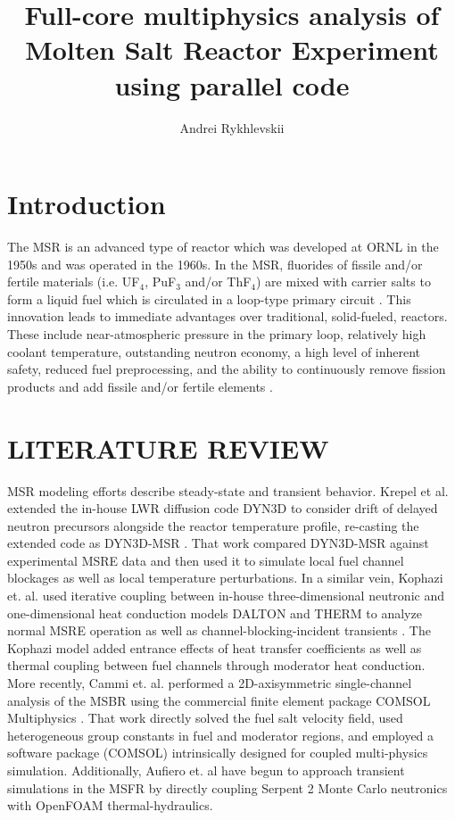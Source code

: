 \documentclass{anstrans}
\title{Full-core multiphysics analysis of Molten Salt Reactor Experiment using parallel code}
\author{Andrei Rykhlevskii}
\begin{document}
\section{Introduction}
The \gls{MSR} is an advanced type of reactor which was developed at \gls{ORNL} 
in the 1950s and was operated in the 1960s. In the MSR, fluorides of fissile 
and/or fertile materials (i.e. UF$_4$, PuF$_3$ and/or ThF$_4$) are mixed with 
carrier salts to form a liquid fuel which is circulated in a loop-type primary 
circuit \cite{haubenreich_experience_1970}. This innovation leads to immediate 
advantages over traditional, solid-fueled, reactors. These include 
near-atmospheric pressure in the primary loop, relatively high coolant 
temperature, outstanding neutron economy, a high level of inherent safety, 
reduced fuel preprocessing, and the ability to continuously remove fission 
products and add fissile and/or fertile elements \cite{leblanc_molten_2010}. 

\section{LITERATURE REVIEW}
\gls{MSR} modeling efforts describe steady-state and
transient behavior. Krepel et al. extended the in-house \gls{LWR}
diffusion code DYN3D to consider drift of delayed neutron precursors alongside
the reactor temperature profile, re-casting the extended code as
DYN3D-MSR \cite{krepel_dyn3d-msr_2007}. That work compared DYN3D-MSR against
experimental \gls{MSRE} data and then used it to simulate local fuel channel
blockages as well as local temperature perturbations. In a similar vein, Kophazi
et. al. used iterative coupling between in-house three-dimensional neutronic and
one-dimensional heat conduction models DALTON and THERM to analyze normal 
\gls{MSRE} operation as well as channel-blocking-incident
transients \cite{kophazi_development_2009}. The Kophazi model added entrance 
effects of heat transfer coefficients as well as thermal
coupling between fuel channels through moderator heat conduction. More recently,
Cammi et. al. performed a 2D-axisymmetric single-channel analysis of the
\gls{MSBR} using the commercial finite element package COMSOL
Multiphysics \cite{cammi_multi-physics_2011}. That work directly solved the 
fuel salt velocity field, used heterogeneous group constants
in fuel and moderator regions, and employed a software package (COMSOL)
intrinsically designed for coupled multi-physics simulation.
Additionally, Aufiero et. al \cite{aufiero_development_2014} have begun to 
approach transient simulations in the \gls{MSFR} by directly coupling Serpent 2 
Monte Carlo neutronics with OpenFOAM \cite{weller_tensorial_1998} thermal-hydraulics.
\end{document}
